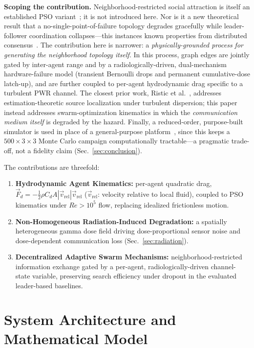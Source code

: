\documentclass[conference]{IEEEtran}
\begin{document}
\textbf{Scoping the contribution.} Neighborhood-restricted social attraction is itself an established PSO variant~\cite{kennedy_small_worlds,mendes_fips}; it is not introduced here. Nor is it a new theoretical result that a no-single-point-of-failure topology degrades gracefully while leader-follower coordination collapses---this instances known properties from distributed consensus~\cite{olfati_saber_murray}. The contribution here is narrower: a \emph{physically-grounded process for generating the neighborhood topology itself}. In this process, graph edges are jointly gated by inter-agent range and by a radiologically-driven, dual-mechanism hardware-failure model (transient Bernoulli drops and permanent cumulative-dose latch-up), and are further coupled to per-agent hydrodynamic drag specific to a turbulent PWR channel. The closest prior work, Ristic et al.~\cite{ristic_turbulent_search}, addresses estimation-theoretic source localization under turbulent dispersion; this paper instead addresses swarm-optimization kinematics in which the \emph{communication medium itself} is degraded by the hazard. Finally, a reduced-order, purpose-built simulator is used in place of a general-purpose platform~\cite{wright_gazebo_radiation}, since this keeps a $500\times3\times3$ Monte Carlo campaign computationally tractable---a pragmatic trade-off, not a fidelity claim (Sec.~\ref{sec:conclusion}).

The contributions are threefold:
\begin{enumerate}
\item \textbf{Hydrodynamic Agent Kinematics:} per-agent quadratic drag, $\vec{F}_d = -\tfrac{1}{2}\rho C_d A |\vec{v}_{\text{rel}}|\vec{v}_{\text{rel}}$ ($\vec{v}_{\text{rel}}$: velocity relative to local fluid), coupled to PSO kinematics under $Re>10^5$ flow, replacing idealized frictionless motion.
\item \textbf{Non-Homogeneous Radiation-Induced Degradation:} a spatially heterogeneous gamma dose field driving dose-proportional sensor noise and dose-dependent communication loss (Sec.~\ref{sec:radiation}).
\item \textbf{Decentralized Adaptive Swarm Mechanisms:} neighborhood-restricted information exchange gated by a per-agent, radiologically-driven channel-state variable, preserving search efficiency under dropout in the evaluated leader-based baselines.
\end{enumerate}

\section{System Architecture and Mathematical Model}
\label{sec:architecture}
\end{document}

